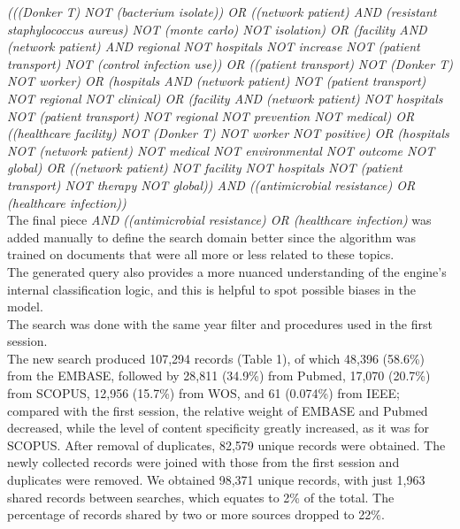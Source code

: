 \documentclass[]{bmcart}
\begin{document}
\emph{(((Donker T) NOT (bacterium isolate)) OR ((network patient) AND
(resistant staphylococcus aureus) NOT (monte carlo) NOT isolation) OR
(facility AND (network patient) AND regional NOT hospitals NOT increase
NOT (patient transport) NOT (control infection use)) OR ((patient
transport) NOT (Donker T) NOT worker) OR (hospitals AND (network
patient) NOT (patient transport) NOT regional NOT clinical) OR (facility
AND (network patient) NOT hospitals NOT (patient transport) NOT regional
NOT prevention NOT medical) OR ((healthcare facility) NOT (Donker T) NOT
worker NOT positive) OR (hospitals NOT (network patient) NOT medical NOT
environmental NOT outcome NOT global) OR ((network patient) NOT facility
NOT hospitals NOT (patient transport) NOT therapy NOT global)) AND
((antimicrobial resistance) OR (healthcare infection))}\\

The final piece \emph{AND ((antimicrobial resistance) OR (healthcare
infection)} was added manually to define the search domain better since
the algorithm was trained on documents that were all more or less
related to these topics.\\
The generated query also provides a more nuanced understanding of the
engine's internal classification logic, and this is helpful to spot
possible biases in the model.\\

The search was done with the same year filter and procedures used in the
first session.\\

The new search produced 107,294 records (Table 1), of which 48,396
(58.6\%) from the EMBASE, followed by 28,811 (34.9\%) from Pubmed,
17,070 (20.7\%) from SCOPUS, 12,956 (15.7\%) from WOS, and 61 (0.074\%)
from IEEE; compared with the first session, the relative weight of
EMBASE and Pubmed decreased, while the level of content specificity
greatly increased, as it was for SCOPUS. After removal of duplicates,
82,579 unique records were obtained. The newly collected records were
joined with those from the first session and duplicates were removed. We
obtained 98,371 unique records, with just 1,963 shared records between
searches, which equates to 2\% of the total. The percentage of records
shared by two or more sources dropped to 22\%.
\end{document}
